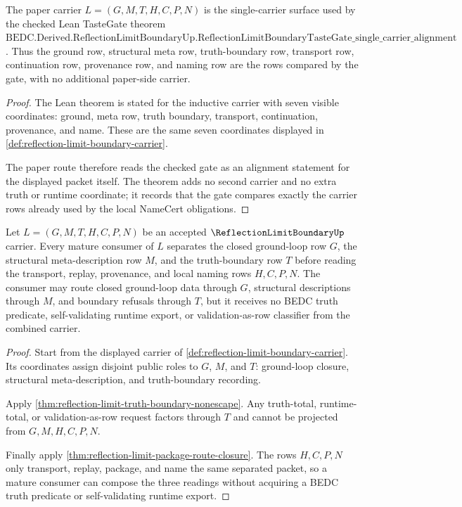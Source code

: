 \begin{theorem}
\label{thm:reflection-limit-tastegate-route-alignment}
The paper carrier $L=(G,M,T,H,C,P,N)$ is the single-carrier surface used by the checked Lean TasteGate theorem
$\mathrm{BEDC.Derived.ReflectionLimitBoundaryUp.ReflectionLimitBoundaryTasteGate\_single\_carrier\_alignment}$.
Thus the ground row, structural meta row, truth-boundary row, transport row, continuation row, provenance row, and naming row are the rows compared by the gate, with no additional paper-side carrier.
\end{theorem}
\begin{proof}
The Lean theorem is stated for the inductive carrier with seven visible coordinates: ground, meta row, truth boundary, transport, continuation, provenance, and name. These are the same seven coordinates displayed in \autoref{def:reflection-limit-boundary-carrier}.

The paper route therefore reads the checked gate as an alignment statement for the displayed packet itself. The theorem adds no second carrier and no extra truth or runtime coordinate; it records that the gate compares exactly the carrier rows already used by the local NameCert obligations.
\end{proof}

\begin{theorem}
\label{thm:reflection-limit-mature-consumer-separation}
Let $L=(G,M,T,H,C,P,N)$ be an accepted $\ReflectionLimitBoundaryUp$ carrier. Every mature consumer of $L$ separates the closed ground-loop row $G$, the structural meta-description row $M$, and the truth-boundary row $T$ before reading the transport, replay, provenance, and local naming rows $H,C,P,N$. The consumer may route closed ground-loop data through $G$, structural descriptions through $M$, and boundary refusals through $T$, but it receives no BEDC truth predicate, self-validating runtime export, or validation-as-row classifier from the combined carrier.
\end{theorem}
\begin{proof}
Start from the displayed carrier of \autoref{def:reflection-limit-boundary-carrier}. Its coordinates assign disjoint public roles to $G$, $M$, and $T$: ground-loop closure, structural meta-description, and truth-boundary recording.

Apply \autoref{thm:reflection-limit-truth-boundary-nonescape}. Any truth-total, runtime-total, or validation-as-row request factors through $T$ and cannot be projected from $G,M,H,C,P,N$.

Finally apply \autoref{thm:reflection-limit-package-route-closure}. The rows $H,C,P,N$ only transport, replay, package, and name the same separated packet, so a mature consumer can compose the three readings without acquiring a BEDC truth predicate or self-validating runtime export.
\end{proof}


